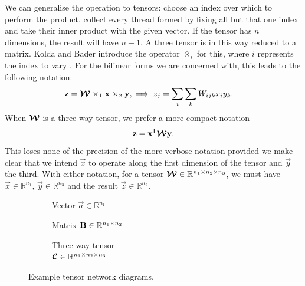 We can generalise the operation to tensors: choose an index over which to perform the product,
collect every thread formed by fixing all but that one index and take their inner product with the
given vector. If the tensor has \(n\) dimensions, the result will have \(n-1\). A three tensor is in
this way reduced to a matrix. Kolda and Bader introduce the operator
 \( \bar{\times}_i \)
for this, where \(i\) represents the index to vary \autocite{Kolda2009}. For the bilinear forms
we are concerned with, this leads to the following notation:
\begin{align}
	\mathbf{z} &= \bm{\mathcal{W}} \;\bar{\times}_1\; \mathbf{x}\; \bar{\times}_2\; \mathbf{y},
	\implies z_j = \sum_i \sum_k W_{ijk}x_iy_k.
	\label{eq:bilinearkolda}
\end{align}
When \(\bm{\mathcal{W}}\) is a three-way tensor, we prefer a more compact notation
\begin{equation}\label{eq:bilintensor}
	\mathbf{z} = \mathbf{x}^{\mkern-1.5mu\mathsf{T}}\bm{\mathcal{W}}\mathbf{y}.
\end{equation} This loses none of the precision of the more verbose notation provided we make clear
that we intend \(\vec{x}\) to operate along the first dimension of the tensor and \(\vec{y}\) the
third. With either notation, for a tensor 
\(\bm{\mathcal{W}} \in \mathbb{R}^{n_1 \times n_2 \times n_3}\), we must have 
\(\vec{x}\in \mathbb{R}^{n_1}\), \(\vec{y} \in \mathbb{R}^{n_3}\) and the result 
\(\vec{z}\in\mathbb{R}^{n_2}\).

\begin{figure}
	\centering
	\begin{subfigure}[t]{0.31\textwidth}
	\centering
	\caption{Vector \(\vec{a}\in\mathbb{R}^{n_1}\)}\label{fig:tnd:vec}
	\end{subfigure} \hfill
	\begin{subfigure}[t]{0.31\textwidth}
	\centering
	\caption{Matrix \(\mathbf{B}\in\mathbb{R}^{n_1 \times n_2}\)}\label{fig:tnd:mat}
	\end{subfigure}\hfill
	\begin{subfigure}[t]{0.31\textwidth}
	\centering
	\caption{Three-way tensor\\ 
		\(\bm{\mathcal{C}}\in\mathbb{R}^{n_1\times n_2\times n_3}\)}\label{fig:tnd:3ten}
	\end{subfigure}
	\caption{Example tensor network diagrams.}
	\label{fig:tnegs}
\end{figure}

